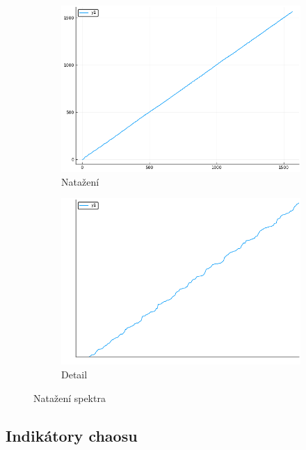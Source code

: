 \documentclass{article}
\begin{document}
    \begin{figure}[H]
        \centering
        \begin{subfigure}{.5\textwidth}
          \centering
          \includegraphics[width=.95\linewidth]{stretched.png}
          \caption{Natažení}
          \label{fig:sub1}
        \end{subfigure}%
        \begin{subfigure}{.5\textwidth}
          \centering
          \includegraphics[width=.95\linewidth]{detailStretched.png}
          \caption{Detail}
          \label{fig:sub2}
        \end{subfigure}
        \caption{Natažení spektra}
        \label{fig:test}
        \end{figure}

\subsection{Indikátory chaosu}
\end{document}
